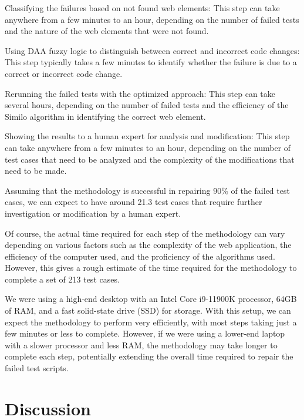 \documentclass{article}
\begin{document}
Classifying the failures based on not found web elements: This step can take anywhere from a few minutes to an hour, depending on the number of failed tests and the nature of the web elements that were not found.

Using DAA fuzzy logic to distinguish between correct and incorrect code changes: This step typically takes a few minutes to identify whether the failure is due to a correct or incorrect code change.

Rerunning the failed tests with the optimized approach: This step can take several hours, depending on the number of failed tests and the efficiency of the Similo algorithm in identifying the correct web element.

Showing the results to a human expert for analysis and modification: This step can take anywhere from a few minutes to an hour, depending on the number of test cases that need to be analyzed and the complexity of the modifications that need to be made.

Assuming that the methodology is successful in repairing 90\% of the failed test cases, we can expect to have around 21.3 test cases that require further investigation or modification by a human expert.

Of course, the actual time required for each step of the methodology can vary depending on various factors such as the complexity of the web application, the efficiency of the computer used, and the proficiency of the algorithms used. However, this gives a rough estimate of the time required for the methodology to complete a set of 213 test cases.

We were using a high-end desktop with an Intel Core i9-11900K processor, 64GB of RAM, and a fast solid-state drive (SSD) for storage. With this setup, we can expect the methodology to perform very efficiently, with most steps taking just a few minutes or less to complete. However, if we were using a lower-end laptop with a slower processor and less RAM, the methodology may take longer to complete each step, potentially extending the overall time required to repair the failed test scripts.

\maketitle

\section{Discussion}
\end{document}
